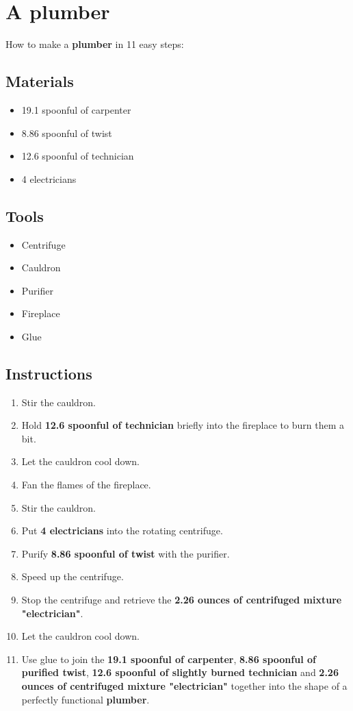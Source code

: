 \documentclass{article}
\begin{document}
\section{A plumber}How to make a \textbf{plumber} in 11 easy steps:

\subsection{Materials}\begin{itemize}
\item 
19.1 spoonful of carpenter
\item 
8.86 spoonful of twist
\item 
12.6 spoonful of technician
\item 
4 electricians
\end{itemize}
\subsection{Tools}\begin{itemize}
\item 
Centrifuge
\item 
Cauldron
\item 
Purifier
\item 
Fireplace
\item 
Glue
\end{itemize}
\subsection{Instructions}\begin{enumerate}
\item 
Stir the cauldron.
\item 
Hold \textbf{12.6 spoonful of technician} briefly into the fireplace to burn them a bit.
\item 
Let the cauldron cool down.
\item 
Fan the flames of the fireplace.
\item 
Stir the cauldron.
\item 
Put \textbf{4 electricians} into the rotating centrifuge.
\item 
Purify \textbf{8.86 spoonful of twist} with the purifier.
\item 
Speed up the centrifuge.
\item 
Stop the centrifuge and retrieve the \textbf{2.26 ounces of centrifuged mixture "electrician"}.
\item 
Let the cauldron cool down.
\item 
Use glue to join the \textbf{19.1 spoonful of carpenter}, \textbf{8.86 spoonful of purified twist}, \textbf{12.6 spoonful of slightly burned technician} and \textbf{2.26 ounces of centrifuged mixture "electrician"} together into the shape of a perfectly functional \textbf{plumber}.
\end{enumerate}
\newpage
\end{document}

